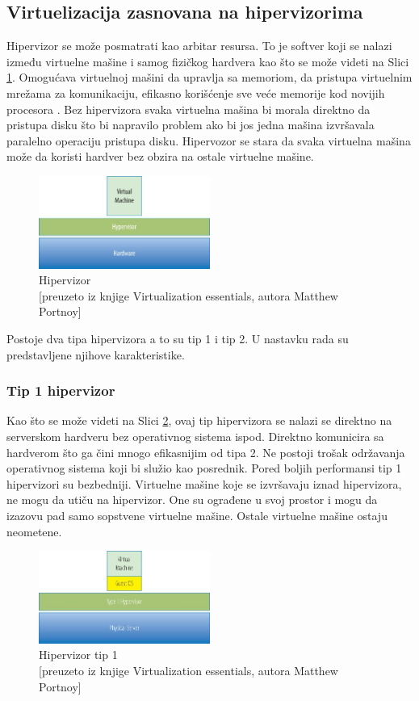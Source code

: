 \documentclass[12pt,oneside]{memoir}
\begin{document}
\subsection{Virtuelizacija zasnovana na hipervizorima}
Hipervizor se može posmatrati kao arbitar resursa. To je softver koji se nalazi između virtuelne mašine i samog fizičkog hardvera kao što se može videti na Slici \ref{fig:hipervizor}. Omogućava virtuelnoj mašini da upravlja sa memoriom, da pristupa virtuelnim mrežama za komunikaciju, efikasno korišćenje sve veće memorije kod novijih procesora \cite{ve}. Bez hipervizora svaka virtuelna mašina bi morala direktno da pristupa disku što bi napravilo problem ako bi jos jedna mašina izvršavala paralelno operaciju pristupa disku. Hipervozor se stara da svaka virtuelna mašina može da koristi hardver bez obzira na ostale virtuelne mašine.
\begin{figure}[!ht]
  \centering
  \includegraphics[width=0.5\textwidth]{Slika 1.jpg}
  \caption{Hipervizor\\\footnotesize[preuzeto iz knjige Virtualization essentials, autora Matthew Portnoy]}
  \label{fig:hipervizor}
\end{figure}
 
Postoje dva tipa hipervizora a to su tip 1 i tip 2. U nastavku rada su predstavljene njihove karakteristike.
 
\subsubsection{Tip 1 hipervizor}
Kao što se može videti na Slici \ref{fig:hipervizorTip1}, ovaj tip hipervizora se nalazi se direktno na serverskom hardveru bez operativnog sistema ispod. Direktno komunicira sa hardverom što ga čini mnogo efikasnijim od tipa 2. Ne postoji trošak održavanja operativnog sistema koji bi služio kao posrednik. Pored boljih performansi tip 1 hipervizori su bezbedniji. Virtuelne mašine koje se izvršavaju iznad hipervizora, ne mogu da utiču na hipervizor. One su ograđene u svoj prostor i mogu da izazovu pad samo sopstvene virtuelne mašine. Ostale virtuelne mašine ostaju neometene.
\begin{figure}[!ht]
  \centering
  \includegraphics[width=0.5\textwidth]{Slika 2.jpg}
  \caption{Hipervizor tip 1\\\footnotesize[preuzeto iz knjige Virtualization essentials, autora Matthew Portnoy]}
  \label{fig:hipervizorTip1}
\end{figure}
\end{document}
